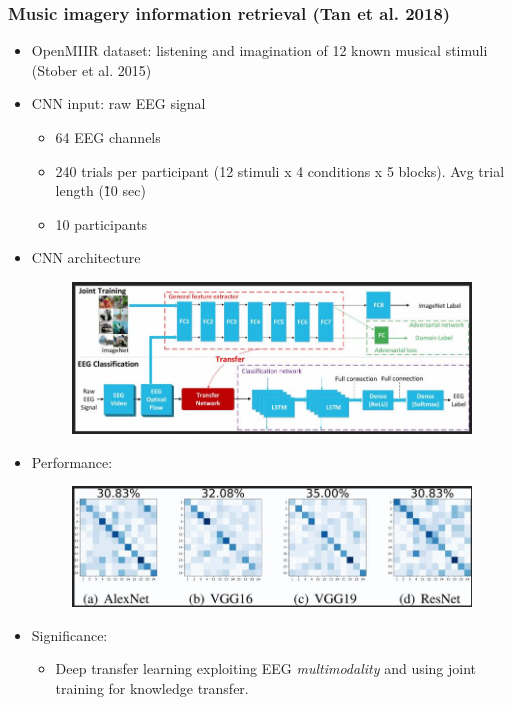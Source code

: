 \documentclass{beamer}
\begin{document}
\begin{frame}
	\frametitle{Music imagery information retrieval (Tan et al. 2018)}
	
	\begin{itemize}

		\item OpenMIIR dataset: listening and imagination of 12 known musical stimuli (Stober et al. 2015)

		\item CNN input: raw EEG signal 
		\begin{itemize}
			\item 64 EEG channels
			\item 240 trials per participant (12 stimuli x 4 conditions x 5 blocks). Avg trial length (\~10 sec)
			\item 10 participants
		\end{itemize}
		
		\item CNN architecture
		\begin{figure}
			\centering
			\includegraphics[scale=0.85]{fig9.jpg}
		\end{figure}
	
		\item Performance:
		\begin{figure}
			\centering
			\includegraphics[scale=0.85]{fig10.jpg}
		\end{figure}
	
		\item Significance:
		\begin{itemize}
			\item Deep transfer learning exploiting EEG \textit{multimodality} and using joint training for knowledge transfer.
		\end{itemize}	
	
	\end{itemize}

\end{frame}
\end{document}
